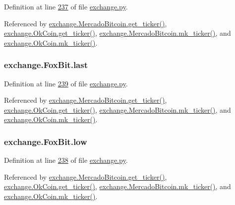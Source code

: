 Definition at line \hyperlink{exchange_8py_source_l00237}{237} of file \hyperlink{exchange_8py_source}{exchange.\+py}.



Referenced by \hyperlink{exchange_8py_source_l00306}{exchange.\+Mercado\+Bitcoin.\+get\+\_\+ticker()}, \hyperlink{exchange_8py_source_l00371}{exchange.\+Ok\+Coin.\+get\+\_\+ticker()}, \hyperlink{exchange_8py_source_l00320}{exchange.\+Mercado\+Bitcoin.\+mk\+\_\+ticker()}, and \hyperlink{exchange_8py_source_l00385}{exchange.\+Ok\+Coin.\+mk\+\_\+ticker()}.

\subsubsection[{\texorpdfstring{last}{last}}]{\setlength{\rightskip}{0pt plus 5cm}exchange.\+Fox\+Bit.\+last}\hypertarget{classexchange_1_1_fox_bit_a5cdbc327b005014dc3b8bb6fb54a12fd}{}\label{classexchange_1_1_fox_bit_a5cdbc327b005014dc3b8bb6fb54a12fd}


Definition at line \hyperlink{exchange_8py_source_l00239}{239} of file \hyperlink{exchange_8py_source}{exchange.\+py}.



Referenced by \hyperlink{exchange_8py_source_l00306}{exchange.\+Mercado\+Bitcoin.\+get\+\_\+ticker()}, \hyperlink{exchange_8py_source_l00371}{exchange.\+Ok\+Coin.\+get\+\_\+ticker()}, \hyperlink{exchange_8py_source_l00320}{exchange.\+Mercado\+Bitcoin.\+mk\+\_\+ticker()}, and \hyperlink{exchange_8py_source_l00385}{exchange.\+Ok\+Coin.\+mk\+\_\+ticker()}.

\subsubsection[{\texorpdfstring{low}{low}}]{\setlength{\rightskip}{0pt plus 5cm}exchange.\+Fox\+Bit.\+low}\hypertarget{classexchange_1_1_fox_bit_acd666444cff98fe477651120ddb0f915}{}\label{classexchange_1_1_fox_bit_acd666444cff98fe477651120ddb0f915}


Definition at line \hyperlink{exchange_8py_source_l00238}{238} of file \hyperlink{exchange_8py_source}{exchange.\+py}.



Referenced by \hyperlink{exchange_8py_source_l00306}{exchange.\+Mercado\+Bitcoin.\+get\+\_\+ticker()}, \hyperlink{exchange_8py_source_l00371}{exchange.\+Ok\+Coin.\+get\+\_\+ticker()}, \hyperlink{exchange_8py_source_l00320}{exchange.\+Mercado\+Bitcoin.\+mk\+\_\+ticker()}, and \hyperlink{exchange_8py_source_l00385}{exchange.\+Ok\+Coin.\+mk\+\_\+ticker()}.

